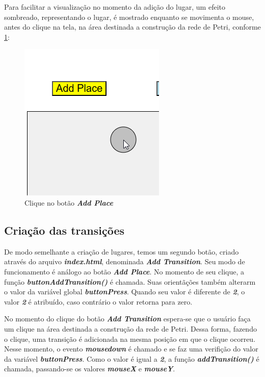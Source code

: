 \documentclass[
	12pt,				%
	openright,			%
	oneside,			%
	a4paper,			%
	english,			%
	brazil				%
	]{abntex2}
\begin{document}
Para facilitar a visualização no momento da adição do lugar, um efeito sombreado, representando o lugar, é mostrado enquanto se movimenta o mouse, antes do clique na tela, na área destinada a construção da rede de Petri, conforme \ref{fig:clique_add_place}:

\begin{figure}[ht] 
	\centering
	\includegraphics[scale=0.55]{figuras/exemplo_clique_addPlace.png}
	\caption[Clicando bo botao Add Place]{Clique no botão \textit{\textbf{Add Place}}}
	\label{fig:clique_add_place}
\end{figure}

\subsection*{Criação das transições}

De modo semelhante a criação de lugares, temos um segundo botão, criado através do arquivo \textbf{\textit{index.html}}, denominada \textbf{\textit{Add Transition}}. Seu modo de funcionamento é análogo ao botão \textbf{\textit{Add Place}}. No momento de seu clique, a função \textbf{\textit{buttonAddTransition()}} é chamada. Suas orientãções também alterarm o valor da variável global \textbf{\textit{buttonPress}}. Quando seu valor é diferente de \textbf{\textit{2}}, o valor \textbf{\textit{2}} é atribuído, caso contrário o valor retorna para zero. 



No momento do clique do botão \textbf{\textit{Add Transition}} espera-se que o usuário faça um clique na área destinada a construção da rede de Petri. Dessa forma, fazendo o clique, uma transição é adicionada na mesma posição em que o clique ocorreu. Nesse momento, o evento \textbf{\textit{mousedown}} é chamado e se faz uma verifição do valor da variável \textbf{\textit{buttonPress}}. Como o valor é igual a \textbf{\textit{2}}, a função \textit{\textbf{addTransition()}} é chamada, passando-se os valores \textbf{\textit{mouseX}} e \textbf{\textit{mouseY}}.
\end{document}
